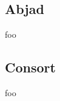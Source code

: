 \begin{singlespacing}
\vspace{-0.5\baselineskip}
\begin{multicols}{2}

\vfill
\columnbreak
\setlength\fboxsep{0pt}
\setlength\fboxrule{0.5pt}
\noindent{}
\end{multicols}
\end{singlespacing}

\subsection{Abjad}

foo

\subsection{Consort}

foo